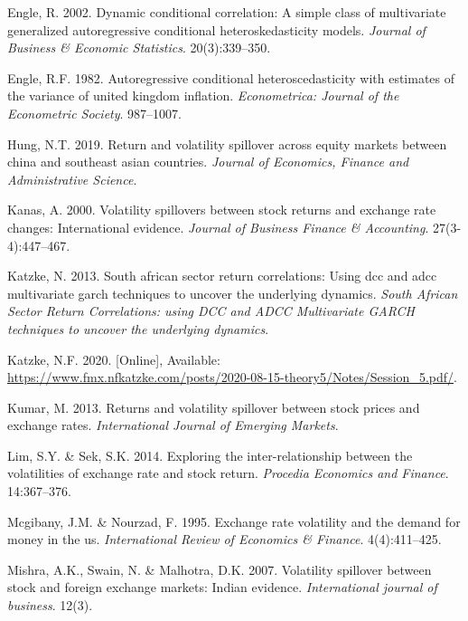\documentclass[11pt,preprint, authoryear]{elsarticle}
\numberwithin{equation}{section}
\numberwithin{figure}{section}
\numberwithin{table}{section}
\begin{document}
\leavevmode\hypertarget{ref-engle2002}{}%
Engle, R. 2002. Dynamic conditional correlation: A simple class of
multivariate generalized autoregressive conditional heteroskedasticity
models. \emph{Journal of Business \& Economic Statistics}.
20(3):339--350.

\leavevmode\hypertarget{ref-engle1982}{}%
Engle, R.F. 1982. Autoregressive conditional heteroscedasticity with
estimates of the variance of united kingdom inflation.
\emph{Econometrica: Journal of the Econometric Society}. 987--1007.

\leavevmode\hypertarget{ref-hung2019}{}%
Hung, N.T. 2019. Return and volatility spillover across equity markets
between china and southeast asian countries. \emph{Journal of Economics,
Finance and Administrative Science}.

\leavevmode\hypertarget{ref-kanas2000}{}%
Kanas, A. 2000. Volatility spillovers between stock returns and exchange
rate changes: International evidence. \emph{Journal of Business Finance
\& Accounting}. 27(3-4):447--467.

\leavevmode\hypertarget{ref-katzke2013}{}%
Katzke, N. 2013. South african sector return correlations: Using dcc and
adcc multivariate garch techniques to uncover the underlying dynamics.
\emph{South African Sector Return Correlations: using DCC and ADCC
Multivariate GARCH techniques to uncover the underlying dynamics}.

\leavevmode\hypertarget{ref-katzke2020}{}%
Katzke, N.F. 2020. {[}Online{]}, Available:
\url{https://www.fmx.nfkatzke.com/posts/2020-08-15-theory5/Notes/Session_5.pdf/}.

\leavevmode\hypertarget{ref-kumar2013}{}%
Kumar, M. 2013. Returns and volatility spillover between stock prices
and exchange rates. \emph{International Journal of Emerging Markets}.

\leavevmode\hypertarget{ref-lim2014}{}%
Lim, S.Y. \& Sek, S.K. 2014. Exploring the inter-relationship between
the volatilities of exchange rate and stock return. \emph{Procedia
Economics and Finance}. 14:367--376.

\leavevmode\hypertarget{ref-mcgibany1995}{}%
Mcgibany, J.M. \& Nourzad, F. 1995. Exchange rate volatility and the
demand for money in the us. \emph{International Review of Economics \&
Finance}. 4(4):411--425.

\leavevmode\hypertarget{ref-mishra2007}{}%
Mishra, A.K., Swain, N. \& Malhotra, D.K. 2007. Volatility spillover
between stock and foreign exchange markets: Indian evidence.
\emph{International journal of business}. 12(3).
\end{document}
